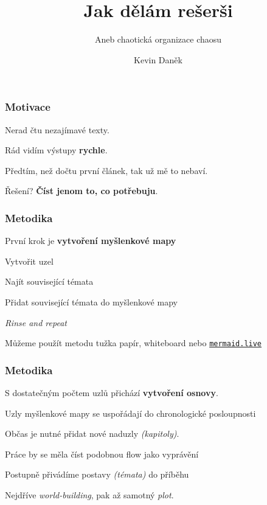 \documentclass[FM]{tulpresentation}
\title{Jak dělám rešerši}
\subtitle{Aneb chaotická organizace chaosu}
\author{Kevin Daněk}
\begin{document}
	
	\TULtitleframe

	\begin{frame}
		\frametitle{Motivace}
		\begin{items}
			\item Nerad čtu nezajímavé texty.
			\item Rád vidím výstupy \textbf{rychle}.
			\item Předtím, než dočtu první článek, tak už mě to nebaví.
			\item Řešení? \textbf{Číst jenom to, co potřebuju}.
		\end{items}
	\end{frame}

	\begin{frame}
		\frametitle{Metodika}
	    \begin{items}
	      \item První krok je \textbf{vytvoření myšlenkové mapy}
	      \begin{subitems}
	      	\item Vytvořit uzel
	      	\item Najít související témata
	      	\item Přidat související témata do myšlenkové mapy
	      	\item \textit{Rinse and repeat}
	      \end{subitems}
	      \item Můžeme použít metodu tužka papír, whiteboard nebo \href{https://mermaid.live}{\texttt{mermaid.live}}
	    \end{items}
	\end{frame}
	
	\begin{frame}
		\frametitle{Metodika}
		\begin{items}
			\item S dostatečným počtem uzlů přichází \textbf{vytvoření osnovy}.
			\begin{subitems}
				\item Uzly myšlenkové mapy se uspořádají do chronologické posloupnosti
				\item Občas je nutné přidat nové naduzly \textit{(kapitoly)}.
			\end{subitems}
			\item Práce by se měla číst podobnou flow jako vyprávění
			\begin{subitems}
				\item Postupně přivádíme postavy \textit{(témata)} do příběhu
				\item Nejdříve \textit{world-building}, pak až samotný \textit{plot}.
			\end{subitems}
		\end{items}
	\end{frame}
	
\end{document}
